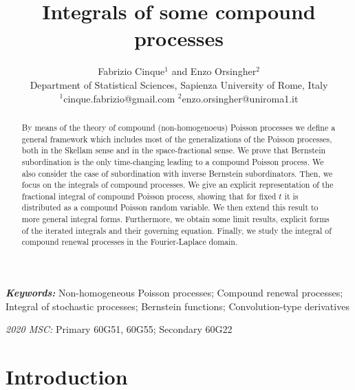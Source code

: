 \documentclass[12pt, twoside, english, headsepline]{article}
\title{Integrals of some compound processes}%
\author{Fabrizio Cinque$^1$ and Enzo Orsingher$^2$\\
        \small Department of Statistical Sciences, Sapienza University of Rome, Italy \\
        \small $^1$cinque.fabrizio@gmail.com $^2$enzo.orsingher@uniroma1.it
}
\theoremstyle{definition} %
\numberwithin{equation}{section} %
\providecommand{\keywords}[1]
{
  \small	
  \textbf{\textit{Keywords: }} #1
}
\providecommand{\MSC}[1]
{
  \small	
  \textit{2020 MSC: } #1   
}
\begin{document}
\maketitle

\begin{abstract}
By means of the theory of compound (non-homogenoeus) Poisson processes we define a general framework which includes most of the generalizations of the Poisson processes, both in the Skellam sense and in the space-fractional sense. We prove that Bernstein subordination is the only time-changing leading to a compound Poisson process. We also consider the case of subordination with inverse Bernstein subordinators. Then, we focus on the integrals of compound processes. We give an explicit representation of the fractional integral of compound Poisson process, showing that for fixed $t$ it is distributed as a compound Poisson random variable. We then extend this result to more general integral forms. Furthermore, we obtain some limit results, explicit forms of the iterated integrals and their governing equation. Finally, we study the integral of compound renewal processes in the Fourier-Laplace domain.
\end{abstract} \hspace{10pt}

\keywords{Non-homogeneous Poisson processes; Compound renewal processes; Integral of stochastic processes; Bernstein functions; Convolution-type derivatives}

\MSC{Primary 60G51, 60G55; Secondary 60G22}



\section{Introduction}
\end{document}
